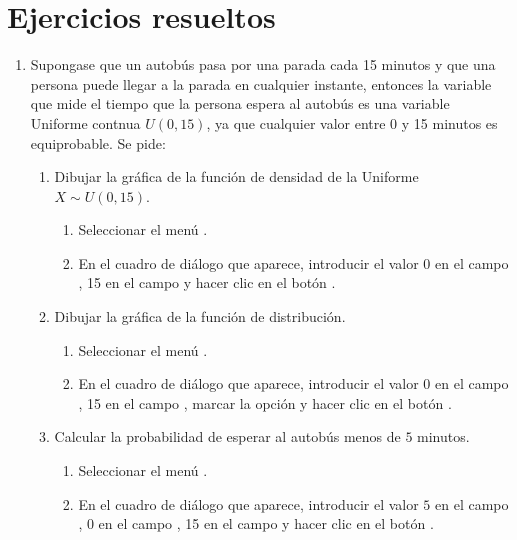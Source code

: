 \section{Ejercicios resueltos}
\begin{enumerate}[leftmargin=*]
\item Supongase que un autobús pasa por una parada cada 15 minutos y que una persona puede llegar a la parada en
cualquier instante, entonces la variable que mide el tiempo que la persona espera al autobús es una variable Uniforme
contnua $U(0,15)$, ya que cualquier valor entre 0 y 15 minutos es equiprobable.
Se pide:
\begin{enumerate}
\item Dibujar la gráfica de la función de densidad de la Uniforme $X\sim U(0,15)$. 
\begin{indicacion}{
\begin{enumerate}
\item Seleccionar el menú .
\item En el cuadro de diálogo que aparece, introducir el valor 0 en el campo , 15 en el campo
 y hacer clic en el botón .
\end{enumerate}}
\end{indicacion}

\item Dibujar la gráfica de la función de distribución. 
\begin{indicacion}{
\begin{enumerate}
\item Seleccionar el menú .
\item En el cuadro de diálogo que aparece, introducir el valor 0 en el campo , 15 en el campo
, marcar la opción  y hacer clic en el botón .
\end{enumerate}}\end{indicacion}

\item Calcular la probabilidad de esperar al autobús menos de $5$ minutos.
\begin{indicacion}{
\begin{enumerate}
\item Seleccionar el menú .
\item En el cuadro de diálogo que aparece, introducir el valor $5$ en el campo , 0 en
el campo , 15 en el campo  y hacer clic en el botón .
\end{enumerate}}
\end{indicacion}


\end{enumerate}
\end{enumerate}
